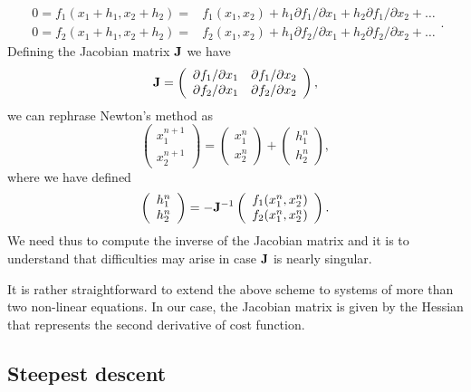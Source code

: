 \documentclass[%
oneside,                 %
final,                   %
10pt]{article}
\begin{document}
\[
   \begin{array}{cc} 0=f_1(x_1+h_1,x_2+h_2)=&f_1(x_1,x_2)+h_1
                     \partial f_1/\partial x_1+h_2
                     \partial f_1/\partial x_2+\dots\\
                     0=f_2(x_1+h_1,x_2+h_2)=&f_2(x_1,x_2)+h_1
                     \partial f_2/\partial x_1+h_2
                     \partial f_2/\partial x_2+\dots
                       \end{array}.
\]
Defining the Jacobian matrix ${\bf \bm{J}}$ we have
\[
 {\bf \bm{J}}=\left( \begin{array}{cc}
                         \partial f_1/\partial x_1  & \partial f_1/\partial x_2 \\
                          \partial f_2/\partial x_1     &\partial f_2/\partial x_2
             \end{array} \right),
\]
we can rephrase Newton's method as
\[
\left(\begin{array}{c} x_1^{n+1} \\ x_2^{n+1} \end{array} \right)=
\left(\begin{array}{c} x_1^{n} \\ x_2^{n} \end{array} \right)+
\left(\begin{array}{c} h_1^{n} \\ h_2^{n} \end{array} \right),
\]
where we have defined
\[
   \left(\begin{array}{c} h_1^{n} \\ h_2^{n} \end{array} \right)=
   -{\bf \bm{J}}^{-1}
   \left(\begin{array}{c} f_1(x_1^{n},x_2^{n}) \\ f_2(x_1^{n},x_2^{n}) \end{array} \right).
\]
We need thus to compute the inverse of the Jacobian matrix and it
is to understand that difficulties  may
arise in case ${\bf \bm{J}}$ is nearly singular.

It is rather straightforward to extend the above scheme to systems of
more than two non-linear equations. In our case, the Jacobian matrix is given by the Hessian that represents the second derivative of cost function. 



\subsection*{Steepest descent}
\end{document}
